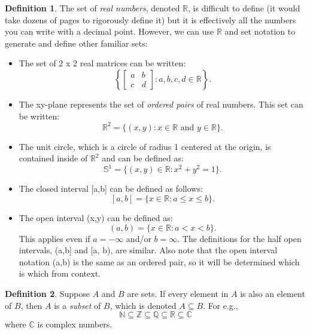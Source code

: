 \documentclass{amsart} %
\theoremstyle{definition} %
\newtheorem*{dfn}{Definition} %
\theoremstyle{definition}
\theoremstyle{remark} %
\begin{document}
\begin{dfn}
 \quad The set of \emph{real numbers}, denoted $\mathbb{R}$, is difficult to define (it would take dozens of pages to rigorously define it) but it is effectively all the numbers you can write with a decimal point. However, we can use $\mathbb{R}$ and set notation to generate and define other familiar sets:

    \begin{itemize}
      \item The set of 2 x 2 real matrices can be written:
            $$ \left\{\begin{bmatrix}
                  a & b \\
                  c & d
                \end{bmatrix} : a, b, c, d \in \mathbb{R}\right\}. $$ %
      \item The xy-plane represents the set of \emph{ordered pairs} of real numbers. This set can be written:
            \[ \mathbb{R}^2 = \{(x,y) : x \in \mathbb{R} \text{ and } y \in \mathbb{R}\}. \]
      \item The unit circle, which is a circle of radius 1 centered at the origin, is contained inside of $\mathbb{R}^2$ and can be defined as:
            \[ \mathbb{S}^1 = \{(x,y) \in \mathbb{R} : x^2 + y^2 = 1\}.  \]
      \item The closed interval [a,b] can be defined as follows:
            \[ [a,b] = \{x \in \mathbb{R} : a \le x \le b\}.  \]
      \item The open interval (x,y) can be defined as:
            \[ (a,b) = \{x \in \mathbb{R} : a < x < b\}. \]
            This applies even if $a = -\infty$ and/or $b = \infty$. The definitions for the half open intervals, (a,b] and [a, b), are similar. Also note that the           open interval notation (a,b) is the same as an ordered pair, so it will be determined which is which from context.
    \end{itemize}

\end{dfn}

\begin{dfn}
\boxed{\subseteq} \quad Suppose $A$ and $B$ are sets. If every element in $A$ is also an element of $B$, then $A$ is a \emph{subset} of $B$, which is denoted $A \subseteq B$. For e.g.,
\[\mathbb{N}\subseteq\mathbb{Z}\subseteq\mathbb{Q}\subseteq\mathbb{R}\subseteq\mathbb{C} \]
where $\mathbb{C}$ is complex numbers.
\end{dfn}
\end{document}
